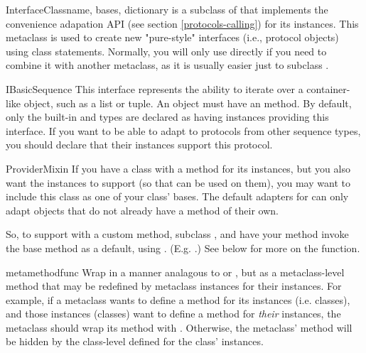 \begin{verbatim%
}
\begin{verbatim%
}
\begin{verbatim%
}
\begin{verbatim%
}
\begin{verbatim%
}
\begin{verbatim%
}
\begin{classdesc}{InterfaceClass}{name, bases, dictionary}
 is a subclass of  that implements
the convenience adapation API (see section \ref{protocols-calling}) for its
instances.  This metaclass is used to create new "pure-style" interfaces (i.e.,
protocol objects) using class statements.  Normally, you will only use
 directly if you need to combine it with another
metaclass, as it is usually easier just to subclass .
\end{classdesc}

\begin{classdesc}{IBasicSequence} 
This interface represents the ability to iterate over a container-like object,
such as a list or tuple.  An  object must have an
 method.  By default, only the built-in  and
 types are declared as having instances providing this interface.
If you want to be able to adapt to  protocols from other
sequence types, you should declare that their instances support this protocol.
\end{classdesc}

\begin{classdesc*}{ProviderMixin}
If you have a class with a  method for its instances, but
you also want the instances to support  (so that
 can be used on them), you may want to include this
class as one of your class' bases.  The default adapters for
 can only adapt objects that do not already have a
 method of their own.

So, to support  with a custom 
method, subclass , and have your 
method invoke the base  method as a default, using
.  (E.g. .)  See below for more on
the  function.
\end{classdesc*}
\begin{funcdesc}{metamethod}{func}
Wrap  in a manner analagous to  or
, but as a metaclass-level method that may be redefined
by metaclass instances for their instances.  For example, if a metaclass wants
to define a  method for its instances (i.e. classes), and
those instances (classes) want to define a  method for
\emph{their} instances, the metaclass should wrap its 
method with .  Otherwise, the metaclass'
 method will be hidden by the class-level
 defined for the class' instances.
\end{funcdesc}


\end{verbatim%
}
\end{verbatim%
}
\end{verbatim%
}
\end{verbatim%
}
\end{verbatim%
}
\end{verbatim%
}

